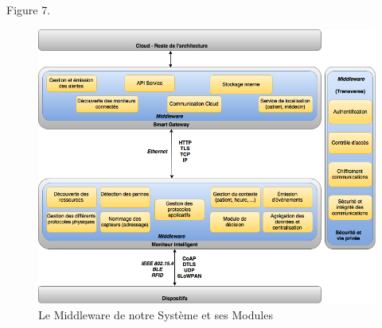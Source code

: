Figure 7.

\begin{figure}[h!]
	\hspace*{-1cm}
	\centering
	\includegraphics[width=1.1\textwidth]{Figure7.png}
	\caption{Le Middleware de notre Système et ses Modules}
	\label{fig:balance}
\end{figure}

